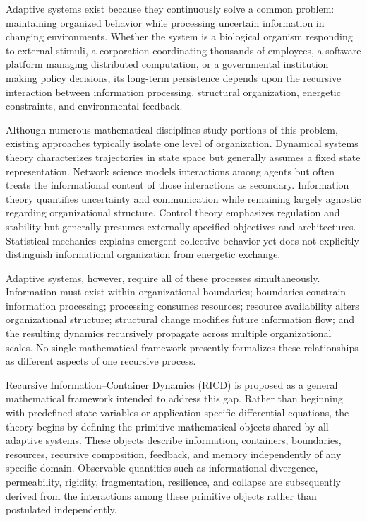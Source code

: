 \documentclass[
]{article}
\begin{document}
Adaptive systems exist because they continuously solve a common problem:
maintaining organized behavior while processing uncertain information in
changing environments. Whether the system is a biological organism
responding to external stimuli, a corporation coordinating thousands of
employees, a software platform managing distributed computation, or a
governmental institution making policy decisions, its long-term
persistence depends upon the recursive interaction between information
processing, structural organization, energetic constraints, and
environmental feedback.

Although numerous mathematical disciplines study portions of this
problem, existing approaches typically isolate one level of
organization. Dynamical systems theory characterizes trajectories in
state space but generally assumes a fixed state representation. Network
science models interactions among agents but often treats the
informational content of those interactions as secondary. Information
theory quantifies uncertainty and communication while remaining largely
agnostic regarding organizational structure. Control theory emphasizes
regulation and stability but generally presumes externally specified
objectives and architectures. Statistical mechanics explains emergent
collective behavior yet does not explicitly distinguish informational
organization from energetic exchange.

Adaptive systems, however, require all of these processes
simultaneously. Information must exist within organizational boundaries;
boundaries constrain information processing; processing consumes
resources; resource availability alters organizational structure;
structural change modifies future information flow; and the resulting
dynamics recursively propagate across multiple organizational scales. No
single mathematical framework presently formalizes these relationships
as different aspects of one recursive process.

Recursive Information--Container Dynamics (RICD) is proposed as a
general mathematical framework intended to address this gap. Rather than
beginning with predefined state variables or application-specific
differential equations, the theory begins by defining the primitive
mathematical objects shared by all adaptive systems. These objects
describe information, containers, boundaries, resources, recursive
composition, feedback, and memory independently of any specific domain.
Observable quantities such as informational divergence, permeability,
rigidity, fragmentation, resilience, and collapse are subsequently
derived from the interactions among these primitive objects rather than
postulated independently.
\end{document}
